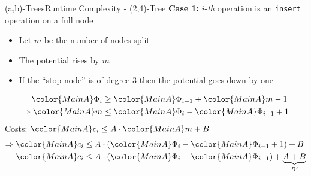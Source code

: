 \begin{frame}{(a,b)-Trees}{Runtime Complexity - (2,4)-Tree}
  \textbf{Case 1:}
  {\color{MainA}$i$}-\textit{th} operation is an
  \texttt{\color{MainA}insert} operation on a full node
  \begin{itemize}
    \item<2->
      Let {\color{MainA}$m$} be the number of nodes split
    \item<3->
      The potential rises by {\color{MainA}$m$}
    \item<4->
      If the \enquote{stop-node} is of {\color{MainA}degree 3} then the
      potential goes down by one
  \end{itemize}
  \begin{align*}
    {\color{MainA}\Phi_i}
      &\geq {\color{MainA}\Phi_{i-1}} + {\color{MainA}m} - 1\\
    \Rightarrow {\color{MainA}m}
      &\leq {\color{MainA}\Phi_i} - {\color{MainA}\Phi_{i-1}} + 1
  \end{align*}
  Costs:
  \begin{math}
    {\color{MainA}c_i} \leq A \cdot {\color{MainA}m} + B
  \end{math}
  \begin{align*}
    \Rightarrow {\color{MainA}c_i}
      &\leq A \cdot \left(
        {\color{MainA}\Phi_i} - {\color{MainA}\Phi_{i-1}} + 1
      \right) + B\\
    {\color{MainA}c_i}
      &\leq A \cdot \left(
      {\color{MainA}\Phi_i} - {\color{MainA}\Phi_{i-1}}
      \right) + \underbrace{A + B}_{B'}\\
  \end{align*}
\end{frame}


